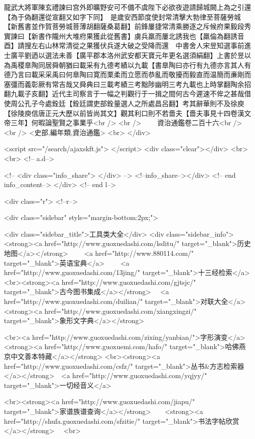 龍武大將軍陳玄禮諫曰宫外即曠野安可不備不虞陛下必欲夜遊請歸城闕上為之引還【為于偽翻還從宣翻又如字下同】　是歲安西節度使封常清擊大勃律至菩薩勞城【新舊書並作賀菩勞城菩薄胡翻薩桑葛翻】前鋒屢捷常清乘勝逐之斥候府果毅段秀實諫曰【新書作隴州大堆府果獲此從舊書】虜兵羸而屢北誘我也【羸倫為翻誘音酉】請搜左右山林常清從之果獲伏兵遂大破之受降而還　中書舍人宋昱知選事前進士廣平劉迺以選法未善【廣平郡本洛州武安都天寶元年更名選須絹翻】上書於昱以為禹稷臯陶同居舜朝猶曰載采有九德考績以九載【書臯陶曰亦行有九德亦言其人有德乃言曰載采采禹曰何臯陶曰寛而栗柔而立愿而恭亂而敬擾而毅直而温簡而亷剛而塞彊而義彰厥有常吉哉又舜典曰三載考績三考黜陟幽明三考九載也上時掌翻陶余招翻九載子亥翻】近代主司察言于一幅之判觀行于一揖之間何古今遲速不侔之甚哉借使周公孔子今處銓廷【銓廷謂吏部銓量選人之所處昌呂翻】考其辭華則不及徐庾【徐陵庾信唐正元大歷以前皆尚其文】觀其利口則不若嗇夫【嗇夫事見十四卷漢文帝三年】何暇論聖賢之事業乎<br />
<br />
　　資治通鑑卷二百十六<br />
<br />
<史部,編年類,資治通鑑>  <br>
   </div> 

<script src="/search/ajaxskft.js"> </script>
 <div class="clear"></div>
<br>
<br>
 <!-- a.d-->

 <!--
<div class="info_share">
</div> 
-->
 <!--info_share--></div>   <!-- end info_content-->
  </div> <!-- end l-->

<div class="r">   <!--r-->



<div class="sidebar"  style="margin-bottom:2px;">

 
<div class="sidebar_title">工具类大全</div>
<div class="sidebar_info">
<strong><a href="http://www.guoxuedashi.com/lsditu/" target="_blank">历史地图</a></strong>　　
<a href="http://www.880114.com/" target="_blank">英语宝典</a>　　
<a href="http://www.guoxuedashi.com/13jing/" target="_blank">十三经检索</a>　
<br><strong><a href="http://www.guoxuedashi.com/gjtsjc/" target="_blank">古今图书集成</a></strong>　
<a href="http://www.guoxuedashi.com/duilian/" target="_blank">对联大全</a>　<strong><a href="http://www.guoxuedashi.com/xiangxingzi/" target="_blank">象形文字典</a></strong>　

<br><a href="http://www.guoxuedashi.com/zixing/yanbian/">字形演变</a>　　<strong><a href="http://www.guoxuemi.com/hafo/" target="_blank">哈佛燕京中文善本特藏</a></strong>
<br><strong><a href="http://www.guoxuedashi.com/csfz/" target="_blank">丛书&方志检索器</a></strong>　<a href="http://www.guoxuedashi.com/yqjyy/" target="_blank">一切经音义</a>　　

<br><strong><a href="http://www.guoxuedashi.com/jiapu/" target="_blank">家谱族谱查询</a></strong>　　<strong><a href="http://shufa.guoxuedashi.com/sfzitie/" target="_blank">书法字帖欣赏</a></strong>　
<br>

